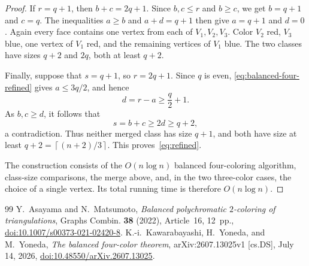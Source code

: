 \documentclass[10pt,a4paper]{amsart}
\newcommand{\ceil}[1]{\left\lceil #1\right\rceil}
\begin{document}
\begin{proof}
If $r=q+1$, then $b+c=2q+1$.  Since $b,c\le r$ and $b\ge c$, we get
$b=q+1$ and $c=q$.  The inequalities $a\ge b$ and $a+d=q+1$ then give
$a=q+1$ and $d=0$.  Again every face contains one vertex from each of
$V_1,V_2,V_3$.  Color $V_2$ red, $V_3$ blue, one vertex of $V_1$ red,
and the remaining vertices of $V_1$ blue.  The two classes have sizes
$q+2$ and $2q$, both at least $q+2$.

Finally, suppose that $s=q+1$, so $r=2q+1$.  Since $q$ is even,
\eqref{eq:balanced-four-refined} gives $a\le3q/2$, and hence
\[
  d=r-a\ge\frac q2+1.
\]
As $b,c\ge d$, it follows that
\[
  s=b+c\ge2d\ge q+2,
\]
a contradiction.  Thus neither merged class has size $q+1$, and both
have size at least
$q+2=\ceil{(n+2)/3}$.  This proves~\eqref{eq:refined}.

The construction consists of the $O(n\log n)$ balanced four-coloring
algorithm, class-size comparisons, the merge above, and, in the two
three-color cases, the choice of a single vertex.  Its total running time
is therefore $O(n\log n)$.
\end{proof}

\begin{thebibliography}{99}
 Y.~Asayama and N.~Matsumoto, \emph{Balanced polychromatic $2$-coloring of triangulations}, Graphs Combin. \textbf{38} (2022), Article~16, 12~pp., \href{https://doi.org/10.1007/s00373-021-02420-8} {doi:10.1007/s00373-021-02420-8}.
 K.-i.~Kawarabayashi, H.~Yoneda, and M.~Yoneda, \emph{The balanced four-color theorem}, arXiv:2607.13025v1 [cs.DS], July 14, 2026, \href{https://doi.org/10.48550/arXiv.2607.13025} {doi:10.48550/arXiv.2607.13025}.
\end{thebibliography}
\end{document}
